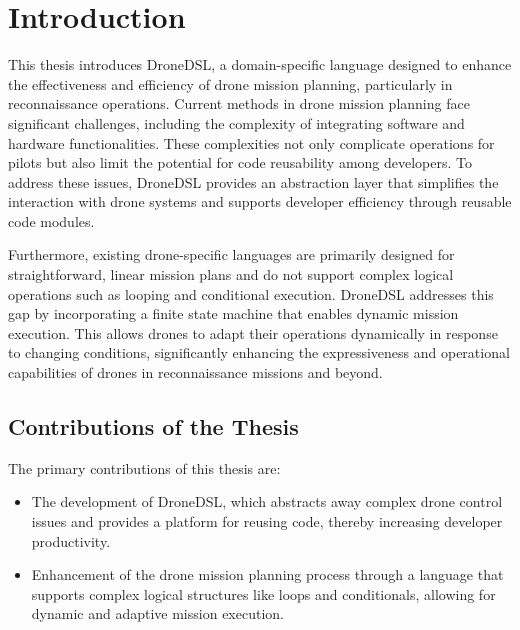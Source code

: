\chapter{Introduction}
\label{sec:intro}

This thesis introduces DroneDSL, a domain-specific language designed to enhance the effectiveness and efficiency of drone mission planning, particularly in reconnaissance operations. Current methods in drone mission planning face significant challenges, including the complexity of integrating software and hardware functionalities. These complexities not only complicate operations for pilots but also limit the potential for code reusability among developers. To address these issues, DroneDSL provides an abstraction layer that simplifies the interaction with drone systems and supports developer efficiency through reusable code modules.

Furthermore, existing drone-specific languages are primarily designed for straightforward, linear mission plans and do not support complex logical operations such as looping and conditional execution. DroneDSL addresses this gap by incorporating a finite state machine that enables dynamic mission execution. This allows drones to adapt their operations dynamically in response to changing conditions, significantly enhancing the expressiveness and operational capabilities of drones in reconnaissance missions and beyond.

\section{Contributions of the Thesis}
The primary contributions of this thesis are:
\begin{itemize}
    \item The development of DroneDSL, which abstracts away complex drone control issues and provides a platform for reusing code, thereby increasing developer productivity.
    \item Enhancement of the drone mission planning process through a language that supports complex logical structures like loops and conditionals, allowing for dynamic and adaptive mission execution.
\end{itemize}

